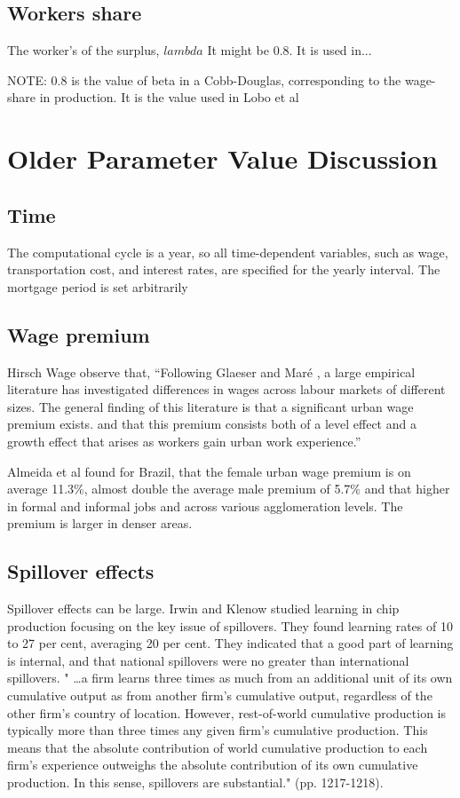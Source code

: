 \subsection{Workers share}
The worker's of the surplus, $lambda$ It might be 0.8. It is used in...

NOTE: 0.8 is the value of beta in a Cobb-Douglas, corresponding to the wage-share in production. It is the value used in Lobo et al


\section{Older Parameter Value Discussion}

\subsection{Time}
 The computational cycle is a year, so all time-dependent variables, such as wage, transportation cost, and interest rates, are specified for the yearly interval. The mortgage period is set arbitrarily 
 
\subsection{Wage premium} \label{section-wage-premium}

Hirsch Wage \cite{hirschUrbanWagePremium2019} observe that, ``Following Glaeser and Maré \cite{glaeserCitiesSkills2001},  a  large  empirical  literature  has  investigated differences in wages across labour markets of different sizes. The general finding of this literature is that a significant urban wage premium exists. and that this premium consists both of a level effect and a growth effect that arises as workers gain urban work experience.'' 

Almeida et al \cite{almeidaUrbanWagePremium2022} found for Brazil, that the female urban wage premium is on average 11.3\%, almost double the average male premium of 5.7\% and that higher in formal and informal jobs and across various agglomeration levels. The premium is larger in denser areas.

\subsection{Spillover effects} \label{section-spillover}

Spillover effects can be large. Irwin and Klenow  studied learning in chip production focusing  on the key issue of spillovers. They found learning rates of 10 to 27 per cent, averaging 20 per cent. They indicated that a good part of learning is internal, and that national spillovers were no greater than international spillovers. " \dots a firm learns three times as much from an additional unit of its own cumulative output as from another firm's cumulative output, regardless of the other firm's country of location. However, rest-of-world cumulative production is typically more than three times any given firm's cumulative production. This means that the absolute contribution of world cumulative production to each firm's experience outweighs the absolute contribution of its own cumulative production. In this sense, spillovers are substantial." (pp. 1217-1218).


